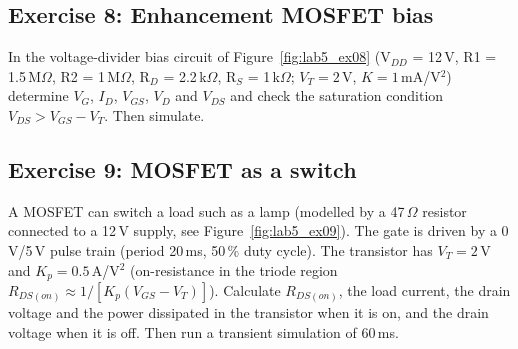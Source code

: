 

\subsection{Exercise 8: Enhancement MOSFET bias}
In the voltage-divider bias circuit of Figure~\ref{fig:lab5_ex08} (V$_{DD}$ = 12\,V, R1 = 1.5\,M$\Omega$, R2 = 1\,M$\Omega$, R$_D$ = 2.2\,k$\Omega$, R$_S$ = 1\,k$\Omega$; $V_T=2$\,V, $K=1$\,mA/V$^2$) determine $V_G$, $I_D$, $V_{GS}$, $V_D$ and $V_{DS}$ and check the saturation condition $V_{DS}>V_{GS}-V_T$. Then simulate.






\subsection{Exercise 9: MOSFET as a switch}
A MOSFET can switch a load such as a lamp (modelled by a 47\,$\Omega$ resistor connected to a 12\,V supply, see Figure~\ref{fig:lab5_ex09}). The gate is driven by a 0\,V/5\,V pulse train (period 20\,ms, 50\,\% duty cycle). The transistor has $V_T=2$\,V and $K_p=0.5$\,A/V$^2$ (on-resistance in the triode region $R_{DS(on)}\approx1/[K_p(V_{GS}-V_T)]$). Calculate $R_{DS(on)}$, the load current, the drain voltage and the power dissipated in the transistor when it is on, and the drain voltage when it is off. Then run a transient simulation of 60\,ms.

